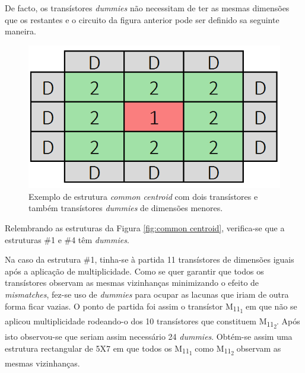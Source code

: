 \documentclass[11pt]{article}
\numberwithin{equation}{section}
\begin{document}
De facto, os transístores \textit{dummies} não necessitam de ter as mesmas dimensões que os restantes e o circuito da figura anterior pode ser definido sa seguinte maneira.

\begin{figure}[H]
	\centering
	\includegraphics[keepaspectratio=true, scale=0.35]{teoricas/dummy3}
	\vspace{-0.5em}
	\caption{Exemplo de estrutura \textit{common centroid} com dois transístores e também transístores \textit{dummies} de dimensões menores.}
	\vspace{-0.8em}
\end{figure}

Relembrando as estruturas da Figura \ref{fig:common centroid}, verifica-se que a estruturas \#1 e \#4 têm \textit{dummies}.

Na caso da estrutura \#1, tinha-se à partida 11 transístores de dimensões iguais após a aplicação de multiplicidade. Como se quer garantir que todos os transístores observam as mesmas vizinhanças minimizando o efeito de \textit{mismatches}, fez-se uso de \textit{dummies} para ocupar as lacunas que iriam de outra forma ficar vazias. O ponto de partida foi assim o transístor M\textsubscript{11\textsubscript{1}} em que não se aplicou multiplicidade rodeando-o dos 10 transístores que constituem M\textsubscript{11\textsubscript{2}}. Após isto observou-se que seriam assim necessário 24 \textit{dummies}. Obtém-se assim uma estrutura rectangular de 5X7 em que todos os M\textsubscript{11\textsubscript{1}} como M\textsubscript{11\textsubscript{2}} observam as mesmas vizinhanças.
		
\end{document}
